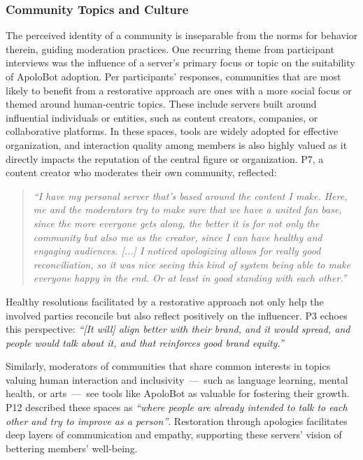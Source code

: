 \subsubsection{Community Topics and Culture}
The perceived identity of a community is inseparable from the norms for behavior therein, guiding moderation practices. One recurring theme from participant interviews was the influence of a server’s primary focus or topic on the suitability of ApoloBot adoption. Per participants' responses, communities that are most likely to benefit from a restorative approach are ones with a more social focus or themed around human-centric topics. These include servers built around influential individuals or entities, such as content creators, companies, or collaborative platforms. In these spaces, tools are widely adopted for effective organization, and interaction quality among members is also highly valued as it directly impacts the reputation of the central figure or organization. P7, a content creator who moderates their own community, reflected: 
\begin{quote}

\textit{“I have my personal server that's based around the content I make. Here, me and the moderators try to make sure that we have a united fan base, since the more everyone gets along, the better it is for not only the community but also me as the creator, since I can have healthy and engaging audiences. [...] I noticed apologizing allows for really good reconciliation, so it was nice seeing this kind of system being able to make everyone happy in the end. Or at least in good standing with each other.''}

\end{quote}

Healthy resolutions facilitated by a restorative approach not only help the involved parties reconcile but also reflect positively on the influencer. P3 echoes this perspective: \textit{“[It will] align better with their brand, and it would spread, and people would talk about it, and that reinforces good brand equity.''} 

Similarly, moderators of communities that share common interests in topics valuing human interaction and inclusivity~---~such as language learning, mental health, or arts~---~see tools like ApoloBot as valuable for fostering their growth. P12 described these spaces as \textit{“where people are already intended to talk to each other and try to improve as a person''}. Restoration through apologies facilitates deep layers of communication and empathy, supporting these servers' vision of bettering members' well-being.

